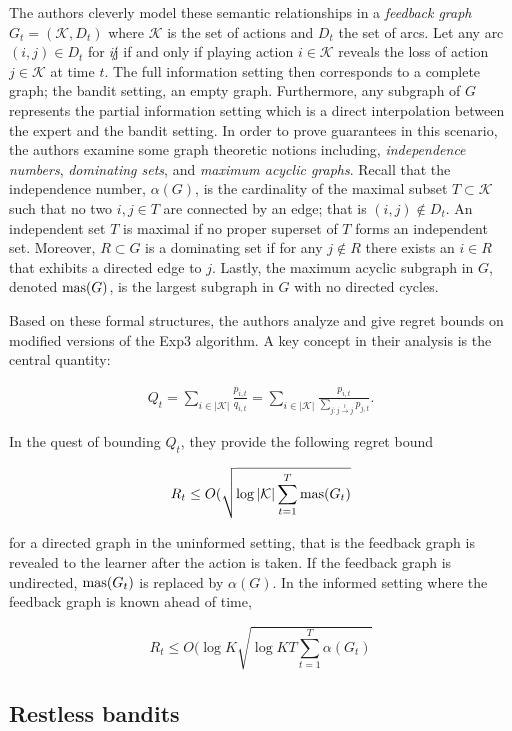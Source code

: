 The authors cleverly model these semantic relationships in a \textit{feedback graph} $G_t=(\mathcal{K},D_t)$ where $\mathcal{K}$ is the set of actions and $D_t$ the set of arcs. Let any arc $(i,j)\in D_t$ for $i\not j$ if and only if playing action $i\in\mathcal{K}$ reveals the loss of action $j\in \mathcal{K}$ at time $t$. The full information setting then corresponds to a complete graph; the bandit setting, an empty graph. Furthermore, any subgraph of $G$ represents the partial information setting which is a direct interpolation between the expert and the bandit setting. In order to prove guarantees in this scenario, the authors examine some graph theoretic notions including, \textit{independence numbers}, \textit{dominating sets}, and \textit{maximum acyclic graphs}. Recall that the independence number, $\alpha(G)$, is the cardinality of the maximal subset $T\subset \mathcal{K}$ such that no two $i,j\in T$ are connected by an edge; that is $(i,j)\not\in D_t$. An independent set $T$ is maximal if no proper superset of $T$ forms an independent set. Moreover, $R\subset G$ is a dominating set if for any $j\not\in R$ there exists an $i\in R$ that exhibits a directed edge to $j$. Lastly, the maximum acyclic subgraph in $G$, denoted $\text{\normalfont mas}(G)$, is the largest subgraph in $G$ with no directed cycles. 

Based on these formal structures, the authors analyze and give regret bounds on modified versions of the Exp3 algorithm. A key concept in their analysis is the central quantity:

\begin{align}
	Q_t=\sum_{i\in |\mathcal{K}|}\frac{p_{i,t}}{q_{i,t}} = \sum_{i\in |\mathcal{K}|}\frac{p_{i,t}}{\sum_{j:j\overset{t}{\to}j} p_{j,t}}.
\end{align}

In the quest of bounding $Q_t$, they provide the following regret bound

$$R_t\leq O(\sqrt{\log |\mathcal{K}|\sum_{t=1}^T\text{\normalfont mas}(G_t)}$$

for a directed graph in the uninformed setting, that is the feedback graph is revealed to the learner after the action is taken. If the feedback graph is undirected, $\text{\normalfont mas}(G_t)$ is replaced by $\alpha(G)$. In the informed setting where the feedback graph is known ahead of time, 

$$R_t \leq O(\log K\sqrt{\log KT\sum_{t=1}^T\alpha(G_t)}$$

\subsection{Restless bandits}

